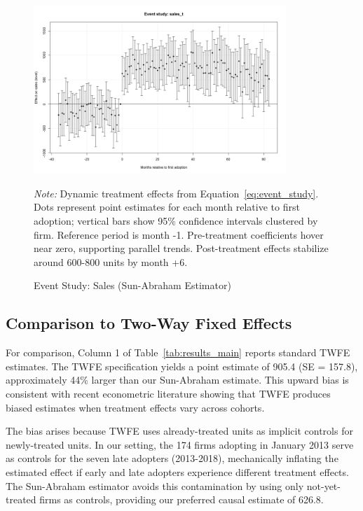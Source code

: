 \documentclass{article}
\begin{document}
\begin{figure}[htbp]
\centering
\includegraphics[width=0.85\textwidth]{es_sales_baseline.png}
\caption{Event Study: Sales (Sun-Abraham Estimator)}
\label{fig:event_study}
\vspace{-0.5em}
{\small \textit{Note:} Dynamic treatment effects from Equation~\ref{eq:event_study}. Dots represent point estimates for each month relative to first adoption; vertical bars show 95\% confidence intervals clustered by firm. Reference period is month -1. Pre-treatment coefficients hover near zero, supporting parallel trends. Post-treatment effects stabilize around 600-800 units by month +6.}
\end{figure}

\subsection{Comparison to Two-Way Fixed Effects}

For comparison, Column 1 of Table~\ref{tab:results_main} reports standard TWFE estimates. The TWFE specification yields a point estimate of 905.4 (SE = 157.8), approximately 44\% larger than our Sun-Abraham estimate. This upward bias is consistent with recent econometric literature showing that TWFE produces biased estimates when treatment effects vary across cohorts. 

The bias arises because TWFE uses already-treated units as implicit controls for newly-treated units. In our setting, the 174 firms adopting in January 2013 serve as controls for the seven late adopters (2013-2018), mechanically inflating the estimated effect if early and late adopters experience different treatment effects. The Sun-Abraham estimator avoids this contamination by using only not-yet-treated firms as controls, providing our preferred causal estimate of 626.8.
\end{document}

